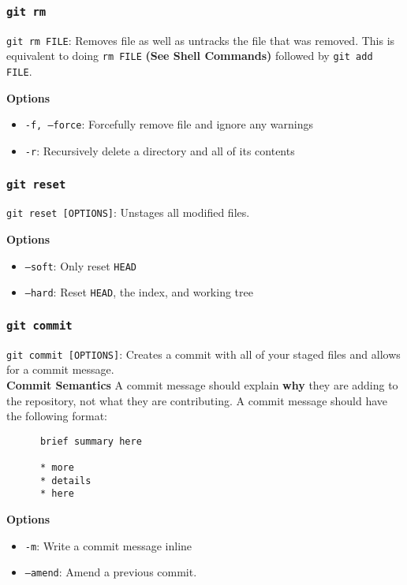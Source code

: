 \documentclass[13pt]{article}
\begin{document}
\subsubsection*{\texttt{git rm}}
\texttt{git rm FILE}: Removes file as well as untracks the file that was removed. This is equivalent to doing \texttt{rm FILE} \textbf{(See Shell Commands)} followed by \texttt{git add FILE}.

\textbf{Options} 
\begin{itemize}[label=]         
\item \texttt{-f, --force}: Forcefully remove file and ignore any warnings
\item \texttt{-r}: Recursively delete a directory and all of its contents
\end{itemize}

\subsubsection*{\texttt{git reset}}
\texttt{git reset [OPTIONS]}: Unstages all modified files.

\textbf{Options}
\begin{itemize}[label=]
\item \texttt{--soft}: Only reset \texttt{HEAD}
\item \texttt{--hard}: Reset \texttt{HEAD}, the index, and working tree
\end{itemize}

\subsubsection*{\texttt{git commit}}
\texttt{git commit [OPTIONS]}: Creates a commit with all of your staged files and allows for a commit message. \\

\textbf{Commit Semantics}
A commit message should explain \textbf{why} they are adding to the repository, not what they are contributing. A commit message should have the following format:
\begin{verbatim}
      brief summary here

      * more
      * details
      * here
\end{verbatim}

\textbf{Options}
\begin{itemize}
\item [] \texttt{-m}: Write a commit message inline
\item [] \texttt{--amend}: Amend a previous commit.
\end{itemize}
\end{document}
